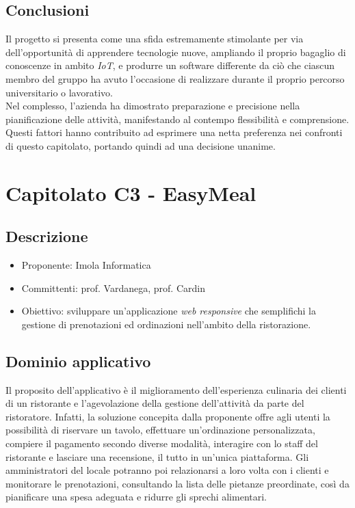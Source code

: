 \documentclass[8pt]{article}
\begin{document}
\subsection{Conclusioni}
Il progetto si presenta come una sfida estremamente stimolante per via dell'opportunità di apprendere tecnologie nuove, ampliando il proprio bagaglio di conoscenze in ambito \textit{IoT}, e produrre un software differente da ciò che ciascun membro del gruppo ha avuto l'occasione di realizzare durante il proprio percorso universitario o lavorativo. \\ Nel complesso, l'azienda ha dimostrato preparazione e precisione nella pianificazione delle attività, manifestando al contempo flessibilità e comprensione. \\ Questi fattori hanno contribuito ad esprimere una netta preferenza nei confronti di questo capitolato, portando quindi ad una decisione unanime.

\newpage

\section{Capitolato C3 - EasyMeal}
\subsection{Descrizione}
\begin{itemize}
	\setlength\itemsep{0em}
	\item Proponente: Imola Informatica
	\item Committenti: prof. Vardanega, prof. Cardin
	\item Obiettivo: sviluppare un'applicazione \textit{web responsive} che semplifichi la gestione di prenotazioni ed ordinazioni nell'ambito della ristorazione.
\end{itemize}

\subsection{Dominio applicativo}
Il proposito dell'applicativo è il miglioramento dell'esperienza culinaria dei clienti di un ristorante e l'agevolazione della gestione dell'attività da parte del ristoratore. Infatti, la soluzione concepita dalla proponente offre agli utenti la possibilità di riservare un tavolo, effettuare un'ordinazione personalizzata, compiere il pagamento secondo diverse modalità, interagire con lo staff del ristorante e lasciare una recensione, il tutto in un'unica piattaforma. Gli amministratori del locale potranno poi relazionarsi a loro volta con i clienti e monitorare le prenotazioni, consultando la lista delle pietanze preordinate, così da pianificare una spesa adeguata e ridurre gli sprechi alimentari.
\end{document}
